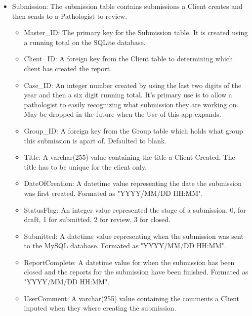 \documentclass[onecolumn, draftclsnofoot,10pt, compsoc]{IEEEtran}
\begin{document}
\begin{itemize}
\item Submission:\newline
The submission table contains submissions a Client creates and then sends to a Pathologist to review.
\begin{itemize}
\item Master\_ID: The primary key for the Submission table. It is created using a running total on the SQLite database.
\item Client\_ID: A foreign key from the Client table to determining which client has created the report.
\item Case\_ID: An integer number created by using the last two digits of the year and then a six digit running total. It's primary use is to allow a pathologist to easily recognizing what submission they are working on. May be dropped in the future when the Use of this app expands. 
\item Group\_ID: A foreign key from the Group table which holds what group this submission is apart of. Defaulted to blank.
\item Title: A varchar(255) value containing the title a Client Created. The title has to be unique for the client only.
\item DateOfCreation: A datetime value representing the date the submission was first created. Formated as "YYYY/MM/DD HH:MM".
\item StatusFlag: An integer value represented the stage of a submission. 0, for draft, 1 for submitted, 2 for review, 3 for closed.
\item Submitted: A datetime value representing when the submission was sent to the MySQL database. Formated as "YYYY/MM/DD HH:MM".
\item ReportComplete: A datetime value for when the submission has been closed and the reports for the submission have been finished. Formated as "YYYY/MM/DD HH:MM".
\item UserComment: A varchar(255) value containing the comments a Client inputed when they where creating the submission.
\end{itemize}


\end{itemize}
\end{document}
